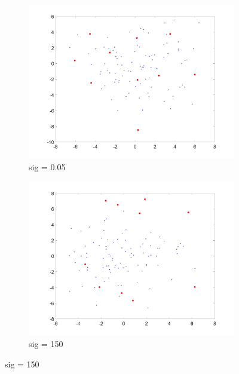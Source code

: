 \documentclass[11pt,oneside,a4paper]{article}
\begin{document}
\begin{figure}[H]
	\begin{subfigure}[b]{0.4\textwidth}
		\includegraphics[width=\textwidth]{../Figures/sig05aprox}
		\caption{sig = 0.05}
	\end{subfigure}
	\begin{subfigure}[b]{0.4\textwidth}
		\includegraphics[width=\textwidth]{../Figures/sig100aprox}
		\caption{sig = 150}
	\end{subfigure}
\end{figure}
\end{document}
